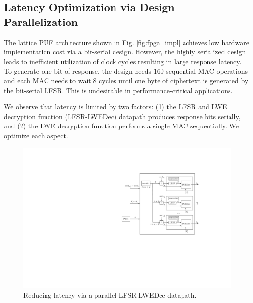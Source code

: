 \subsection{Latency Optimization via Design Parallelization}
\label{sec: lpuf_par}



The lattice PUF architecture shown in Fig. \ref{fig:fpga_impl} achieves low hardware implementation cost via a bit-serial design. %
However, the highly serialized design leads to inefficient utilization of clock cycles resulting in large response latency. To generate one bit of response, the design needs $160$ sequential MAC operations and each MAC needs to wait $8$ cycles until one byte of ciphertext is generated by the bit-serial LFSR. This is undesirable in performance-critical applications. %


We observe that latency is limited by two factors: (1) the LFSR and LWE decryption function (LFSR-LWEDec) datapath produces response bits serially, and (2) the LWE decryption function performs a single MAC sequentially.  We optimize each aspect. %

\begin{figure}[t!]
\centering
\includegraphics[width = 0.8\linewidth]{./figs/lpuf_p1}
\caption{Reducing latency via a parallel LFSR-LWEDec datapath.}
\label{fig:lpuf_p1}
\end{figure}

